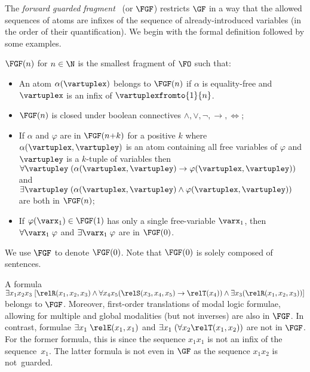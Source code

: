 The \emph{forward guarded fragment}~\cite[Sec. 3.1]{Bednarczyk21} (or $\FGF$) restricts $\GF$ in a way that the allowed sequences of atoms are infixes of the sequence of already-introduced variables (in the order of their quantification).
We begin with the formal definition followed by some examples.
\begin{definition}
  $\FGF(n)$ for $n \in \N$ is the smallest fragment of $\FO$ such that:
  \begin{itemize}\itemsep0em
      \item An atom $\alpha(\vartuplex)$ belongs to $\FGF(n)$ if $\alpha$ is equality-free and $\vartuplex$ is an infix of $\vartuplexfromto{1}{n}$.
      \item $\FGF(n)$ is closed under boolean connectives $\land, \lor, \neg, \to, \iff$;
      \item If $\alpha$ and $\varphi$ are in $\FGF(n{+}k)$ for a positive $k$ where $\alpha(\vartuplex, \vartupley)$ is an atom containing all free variables of $\varphi$ and $\vartupley$ is a $k$-tuple of variables then $\forall{\vartupley} \; (\alpha(\vartuplex, \vartupley) \to \varphi(\vartuplex, \vartupley))$ and $\exists{\vartupley} \; (\alpha(\vartuplex, \vartupley) \land \varphi(\vartuplex, \vartupley))$ are both in $\FGF(n)$;
      \item If $\varphi(\varx_1) \in \FGF(1)$ has only a single free-variable $\varx_1$, then $\forall{\varx_1}\; \varphi$ and $\exists{\varx_1}\; \varphi$ are in $\FGF(0)$.
  \end{itemize}
\end{definition}
We use $\FGF$ to denote $\FGF(0)$. Note that $\FGF(0)$ is solely composed of sentences.

\begin{example}
A formula $\exists{x_1x_{2}x_{3}}\; [\relR(x_{1}, x_{2}, x_{3}) \land \forall{x_{4}x_{5}}(\relS(x_{3}, x_{4}, x_{5}) \to \relT(x_{4})) \land \exists{x_{3}}(\relR(x_{1}, x_{2}, x_{3}))]$ belongs to $\FGF$.
Moreover, first-order translations of modal logic formulae, allowing for multiple and global modalities (but not inverses) are also in $\FGF$.
In contrast, formulae $\exists{x_{1}}\; \relE(x_{1}, x_{1})$ and $\exists{x_{1}}\; (\forall{x_{2}} \relT(x_{1}, x_{2}))$ are not in $\FGF$.
For the former formula, this is since the sequence $x_1x_1$ is not an infix of the sequence~$x_1$.
The latter formula is not even in $\GF$ as the sequence $x_{1}x_{2}$ is not~guarded.
\end{example}
